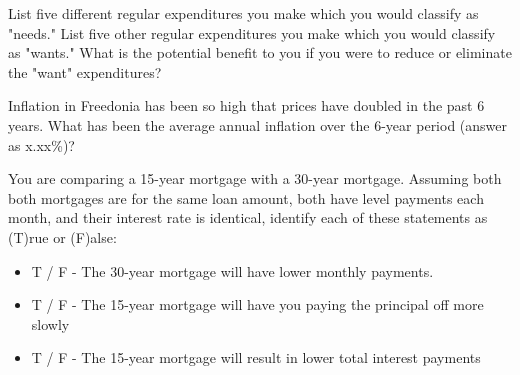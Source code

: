 \documentclass[12pt]{exam}
\begin{document}
\begin{questions}
    \question List five different regular expenditures you make which you would classify as "needs." List five
    other regular expenditures you make which you would classify as "wants." What is the potential benefit to
    you if you were to reduce or eliminate the "want" expenditures?
    \vspace{1in}

    \question Inflation in Freedonia has been so high that prices have doubled in the past 6 years.
    What has been the average annual inflation over the 6-year period (answer as x.xx\%)?
    \vspace{1in}

    \question You are comparing a 15-year mortgage with a 30-year mortgage.  Assuming both
    both mortgages are for the same loan amount, both have level payments each month, and their
    interest rate is identical, identify each of these statements as (T)rue or (F)alse:
    \begin{itemize}
        \item T / F - The 30-year mortgage will have lower monthly payments.
        \item T / F - The 15-year mortgage will have you paying the principal off more slowly
        \item T / F - The 15-year mortgage will result in lower total interest payments
    \end{itemize}

\end{questions}
\end{document}
